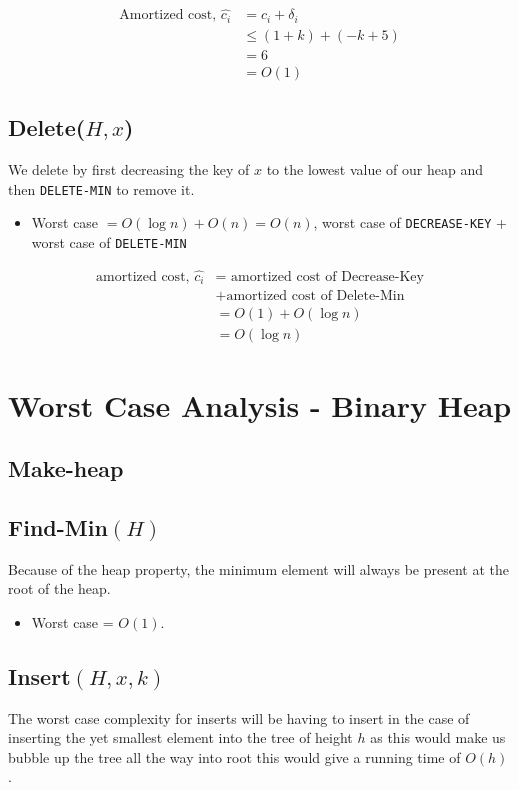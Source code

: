 \documentclass[a4paper,oneside,11pt]{article}
\begin{document}
\begin{itemize}
\begin{align*}
  \text{Amortized cost, }\hat{c_i} &= c_i + \delta_i\\
  &\leq (1+k)+(-k+5)\\
  &= 6\\
  &= O(1)
\end{align*}
\subsection*{Delete($H, x$)}
We delete by first decreasing the key of $x$ to the lowest value of our heap and then \texttt{DELETE-MIN} to remove it.

\begin{itemize}
\item{Worst case} $= O(\log n) + O(n) = O(n)$, worst case of \texttt{DECREASE-KEY} + worst case of \texttt{DELETE-MIN}
\end{itemize}

\begin{align*}
\text{amortized cost, } \hat{c_i} &= \text{ amortized cost of Decrease-Key}\\
&+\text{amortized cost of Delete-Min}\\
&= O(1) + O(\log n)\\
&= O(\log n)
\end{align*}

\section*{Worst Case Analysis - Binary Heap}
\subsection*{Make-heap}


\subsection*{Find-Min$(H)$}
Because of the heap property, the minimum element will always be present at the root of the heap.

\begin{itemize}
\item{Worst case} = $O(1)$.
\end{itemize}

\subsection*{Insert$(H,x,k)$}
The worst case complexity for inserts will be having to insert in the case of inserting the yet smallest element into the tree of height $h$ as this would make us bubble up the tree all the way into root this would give a running time of $O(h)$.


\end{itemize}
\end{document}

